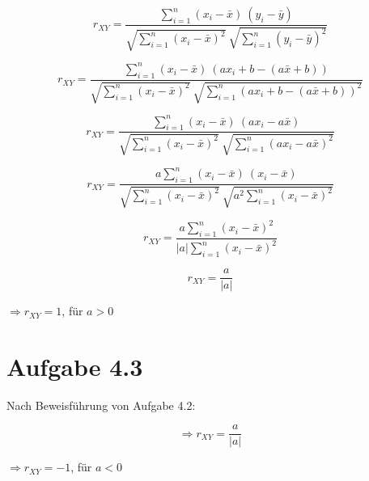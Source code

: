 \begin{equation}
r_{XY} = \frac{\sum_{i=1}^{n} (x_{i} - \bar{x}) \: (y_{i} - \bar{y})}{\sqrt{\sum_{i=1}^{n} (x_{i} - \bar{x})^{2}} \: \sqrt{\sum_{i=1}^{n} (y_{i} - \bar{y})^{2}}} 
\end{equation}

\begin{equation}
r_{XY} = \frac{\sum_{i=1}^{n} (x_{i} - \bar{x}) \: (ax_{i} + b - (a\bar{x} + b))}{\sqrt{\sum_{i=1}^{n} (x_{i} - \bar{x})^{2}} \: \sqrt{\sum_{i=1}^{n} (ax_{i} + b - (a\bar{x} + b))^{2}}} 
\end{equation}

\begin{equation}
r_{XY} = \frac{\sum_{i=1}^{n} (x_{i} - \bar{x}) \: (ax_{i} - a\bar{x})}{\sqrt{\sum_{i=1}^{n} (x_{i} - \bar{x})^{2}} \: \sqrt{\sum_{i=1}^{n} (ax_{i} - a\bar{x})^{2}}} 
\end{equation}

\begin{equation}
r_{XY} = \frac{a\sum_{i=1}^{n} (x_{i} - \bar{x}) \: (x_{i} - \bar{x})}{\sqrt{\sum_{i=1}^{n} (x_{i} - \bar{x})^{2}} \: \sqrt{a^{2} \sum_{i=1}^{n} (x_{i} - \bar{x})^{2}}} 
\end{equation}

\begin{equation}
r_{XY} = \frac{a\sum_{i=1}^{n} (x_{i} - \bar{x})^{2}}{|a|\sum_{i=1}^{n} (x_{i} - \bar{x})^{2}} 
\end{equation}

\begin{equation}
r_{XY} = \frac{a}{|a|} 
\end{equation}

\begin{math}\Rightarrow r_{XY} = 1\end{math}, für \begin{math}a > 0\end{math} 

\section*{Aufgabe 4.3}
Nach Beweisführung von Aufgabe 4.2:

\begin{displaymath}
\Rightarrow r_{XY} = \frac{a}{|a|} 
\end{displaymath}

\begin{math}\Rightarrow r_{XY} = -1\end{math}, für \begin{math}a < 0\end{math} 
	

